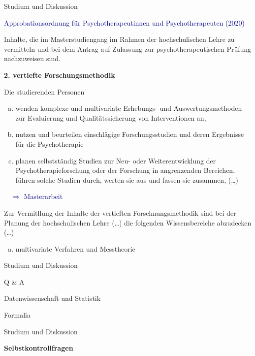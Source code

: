 \documentclass[
  8pt,
  ignorenonframetext,
]{beamer}
\providecommand{\tightlist}{%
  \setlength{\itemsep}{0pt}\setlength{\parskip}{0pt}}
\begin{document}
\begin{frame}{Studium und Diskussion}
\protect\hypertarget{studium-und-diskussion-6}{}

\textcolor{darkblue}{Approbationsordnung für Psychotherapeutinnen und Psychotherapeuten (2020)}
\vspace{2mm}

\footnotesize

Inhalte, die im Masterstudiengang im Rahmen der hochschulischen Lehre zu
vermitteln und bei dem Antrag auf Zulassung zur psychotherapeutischen
Prüfung nachzuweisen sind. \vspace{1mm}

\footnotesize

\noindent \textbf{2. vertiefte Forschungsmethodik}

Die studierenden Personen

\begin{enumerate}
[a)]
\item
  wenden komplexe und multivariate Erhebungs- und Auswertungsmethoden
  zur Evaluierung und Qualitätssicherung von Interventionen an,
\item
  nutzen und beurteilen einschlägige Forschungsstudien und deren
  Ergebnisse für die Psychotherapie
\item
  planen selbstständig Studien zur Neu- oder Weiterentwicklung der
  Psychotherapieforschung oder der Forschung in angrenzenden Bereichen,
  führen solche Studien durch, werten sie aus und fassen sie zusammen,
  (\ldots)
\end{enumerate}

\textcolor{darkblue}{$\quad\Rightarrow$ Masterarbeit}

Zur Vermitllung der Inhalte der vertieften Forschnungsmethodik sind bei
der Planung der hochschulischen Lehre (\ldots) die folgenden
Wissensbereiche abzudecken (\ldots)

\begin{enumerate}
[a)]
\tightlist
\item
  multivariate Verfahren und Messtheorie
\end{enumerate}
\end{frame}

\begin{frame}{Studium und Diskussion}
\protect\hypertarget{studium-und-diskussion-7}{}
\Huge
\vfill
\center

Q \& A \vfill
\end{frame}

\begin{frame}{}
\protect\hypertarget{section-8}{}
\vfill
{}
\Large

Datenwissenschaft und Statistik

Formalia

Studium und Diskussion

\textbf{Selbstkontrollfragen}
\end{frame}
\end{document}
